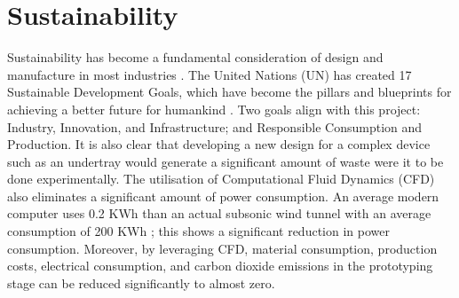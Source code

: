 \section{Sustainability}

\noindent Sustainability has become a fundamental consideration of design and manufacture in most industries \cite{Gates2021HowDisaster}. The United Nations (UN) has created 17 Sustainable Development Goals, which have become the pillars and blueprints for achieving a better future for humankind \cite{UNITEDNATIONS}. Two goals align with this project: Industry, Innovation, and Infrastructure; and Responsible Consumption and Production. It is also clear that developing a new design for a complex device such as an undertray would generate a significant amount of waste were it to be done experimentally. The utilisation of Computational Fluid Dynamics (CFD) also eliminates a significant amount of power consumption. An average modern computer uses 0.2 KWh \cite{Anonymous2021HowEnerguide} than an actual subsonic wind tunnel with an average consumption of 200 KWh \cite{Anonymous2021FAQGroup}; this shows a significant reduction in power consumption. Moreover, by leveraging CFD, material consumption, production costs, electrical consumption, and carbon dioxide emissions in the prototyping stage can be reduced significantly to almost zero. 


